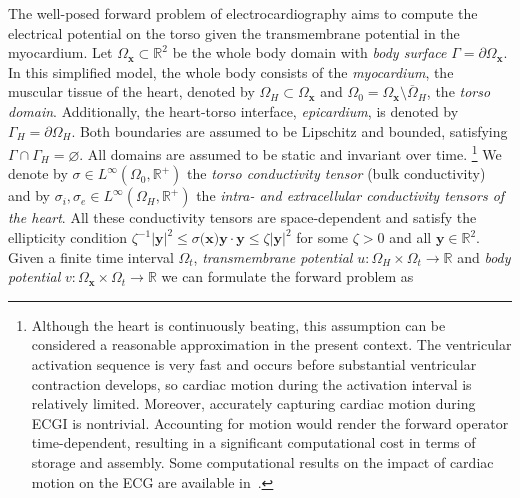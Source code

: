 \documentclass{article}
\newcommand{\R}{\mathbb{R}}
\newcommand{\OmegaSpace}{\Omega_\mathbf{x}}
\newcommand{\OmegaTime}{\Omega_t}
\begin{document}
	The well-posed forward problem of electrocardiography aims to compute the electrical potential on the torso given the transmembrane potential in the myocardium.
	Let $\OmegaSpace \subset \R^2$ be the whole body domain with \emph{body surface} $\Gamma = \partial \OmegaSpace$.
	In this simplified model, the whole body consists of the \emph{myocardium}, the muscular tissue of the heart, denoted by $\Omega_H \subset \OmegaSpace$  and $\Omega_0 = \OmegaSpace \setminus \overline{\Omega}_H$, the \emph{torso domain}.
	Additionally, the heart-torso interface, \emph{epicardium}, is denoted by $\Gamma_H = \partial \Omega_H$.
	Both boundaries are assumed to be Lipschitz and bounded, satisfying $\Gamma \cap \Gamma_H = \varnothing$.
	All domains are assumed to be static and invariant over time.
	\footnote{
		Although the heart is continuously beating, this assumption can be considered a reasonable approximation in the present context.
		The ventricular activation sequence is very fast and occurs before substantial ventricular contraction develops, so cardiac motion during the activation interval is relatively limited.
		Moreover, accurately capturing cardiac motion during ECGI is nontrivial.
		Accounting for motion would render the forward operator time-dependent, resulting in a significant computational cost in terms of storage and assembly.
		Some computational results on the impact of cardiac motion on the ECG are available in~\cite{Mi09, Mo21}.}
	We denote by $\sigma \in L^\infty(\Omega_0, \R^+)$ the \emph{torso conductivity tensor} (bulk conductivity) and by $\sigma_i, \sigma_e \in L^\infty(\Omega_H, \R^+)$ the \emph{intra- and extracellular conductivity tensors of the heart}.
	All these conductivity tensors are space-dependent and satisfy the ellipticity condition $\zeta^{-1} \vert \mathbf{y}\vert^2 \leq \sigma(\mathbf{x)}\mathbf{y}\cdot\mathbf{y} \leq \zeta \vert \mathbf{y}\vert^2$ for some $\zeta > 0$ and all $\mathbf{y} \in \R^2$.
	Given a finite time interval $\OmegaTime$, \emph{transmembrane potential} $u\colon \Omega_H \times \OmegaTime\rightarrow \R$
	and \emph{body potential} $v\colon \OmegaSpace \times \OmegaTime\rightarrow \R$ we can formulate the forward problem as
	
	
	
\end{document}
